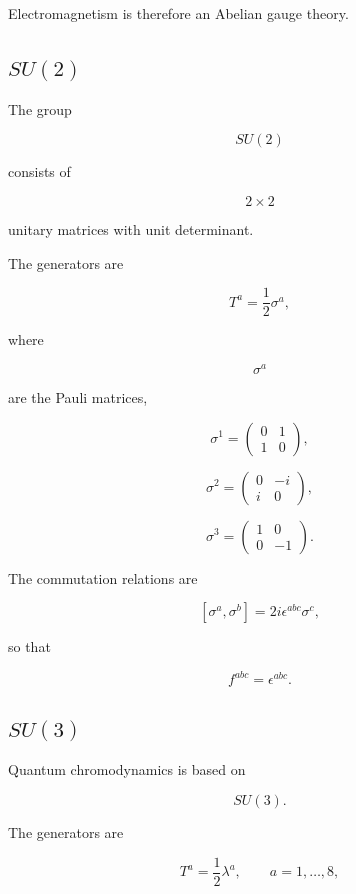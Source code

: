 Electromagnetism is therefore an Abelian gauge theory.


\subsection{$SU(2)$}

The group

\[
SU(2)
\]

consists of

\[
2\times2
\]

unitary matrices with unit determinant.

The generators are

\[
T^a
=
\frac12\sigma^a,
\]

where

\[
\sigma^a
\]

are the Pauli matrices,

\[
\sigma^1=
\begin{pmatrix}
0&1\\
1&0
\end{pmatrix},
\]

\[
\sigma^2=
\begin{pmatrix}
0&-i\\
i&0
\end{pmatrix},
\]

\[
\sigma^3=
\begin{pmatrix}
1&0\\
0&-1
\end{pmatrix}.
\]

The commutation relations are

\[
[\sigma^a,\sigma^b]
=
2i\epsilon^{abc}\sigma^c,
\]

so that

\[
f^{abc}
=
\epsilon^{abc}.
\]


\subsection{$SU(3)$}

Quantum chromodynamics is based on

\[
SU(3).
\]

The generators are

\[
T^a
=
\frac12\lambda^a,
\qquad
a=1,\ldots,8,
\]

